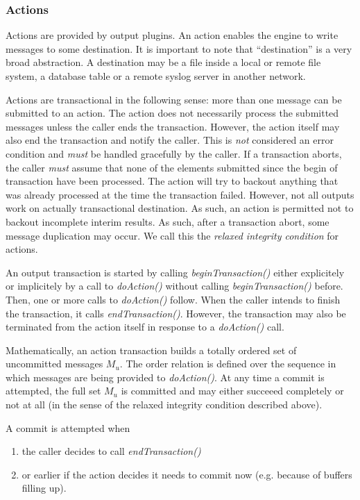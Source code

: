 \documentclass[a4paper,10pt]{article}
\begin{document}
\subsubsection{Actions}
Actions are provided by output plugins. An action enables the engine to write messages to some destination. It is important to note that ``destination'' is a very broad abstraction. A destination may be a file inside a local or remote file system, a database table or a remote syslog server in another network.

Actions are transactional in the following sense: more than one message can be submitted to an action. The action does not necessarily process the submitted messages unless the caller ends the transaction. However, the action itself may also end the transaction and notify the caller. This is \emph{not} considered an error condition and \emph{must} be handled gracefully by the caller. If a transaction aborts, the caller \emph{must} assume that none of the elements submitted since the begin of transaction have been processed. The action will try to backout anything that was already processed at the time the transaction failed. However, not all outputs work on actually transactional destination. As such, an action is permitted not to backout incomplete interim results. As such, after a transaction abort, some message duplication may occur. We call this the \emph{relaxed integrity condition} for actions.

An output transaction is started by calling \emph{beginTransaction()} either explicitely or implicitely by a call to \emph{doAction()} without calling \emph{beginTransaction()} before. Then, one or more calls to \emph{doAction()} follow. When the caller intends to finish the transaction, it calls \emph{endTransaction()}. However, the transaction may also be terminated from the action itself in response to a \emph{doAction()} call.

Mathematically, an action transaction builds a totally ordered set of uncommitted messages $M_u$. The order relation is defined over the sequence in which messages are being provided to \emph{doAction()}. At any time a commit is attempted, the full set $M_u$ is committed and may either succeeed completely or not at all (in the sense of the relaxed integrity condition described above). 

A commit is attempted when 
\begin{enumerate}
\item the caller decides to call \emph{endTransaction()} 
\item or earlier if the action decides it needs to commit now (e.g. because of buffers filling up).
\end{enumerate}
\end{document}
